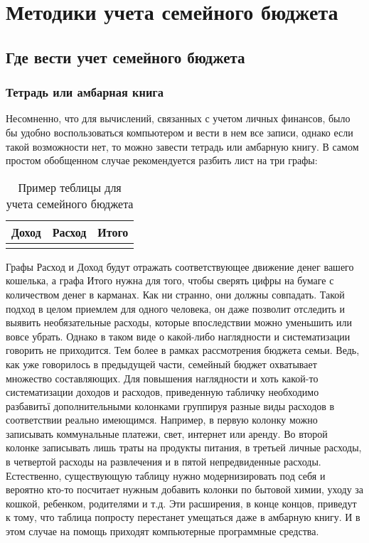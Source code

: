 
\section{Методики учета семейного бюджета}

\subsection{Где вести учет семейного бюджета}

\subsubsection{Тетрадь или амбарная книга}
Несомненно, что для вычислений, связанных с учетом личных финансов,
было бы удобно воспользоваться компьютером и вести в нем все записи, однако если такой возможности нет, то можно завести тетрадь или амбарную
книгу. В самом простом обобщенном случае рекомендуется разбить лист на
три графы:
\begin{table}[H]
\caption{Пример теблицы для учета семейного бюджета}
\label{tab:t1}
\begin{center}
\begin{tabular}{|r|p{5.5cm}|p{2.5cm}|}
\hline 
Доход & Расход & Итого \\ 
\hline 
 &  &  \\ 
\hline 
\end{tabular} 
\end{center}
\end{table}

Графы Расход и Доход будут отражать соответствующее движение
денег вашего кошелька, а графа Итого нужна для того, чтобы сверять цифры на бумаге с количеством денег в карманах. Как ни странно, они должны
совпадать.
Такой подход в целом приемлем для одного человека, он даже позволит
отследить и выявить необязательные расходы, которые впоследствии можно
уменьшить или вовсе убрать. Однако в таком виде о какой-либо наглядности
и систематизации говорить не приходится. Тем более в рамках рассмотрения
бюджета семьи. Ведь, как уже говорилось в предыдущей части, семейный
бюджет охватывает множество составляющих.
Для повышения наглядности и хоть какой-то систематизации доходов и
расходов, приведенную табличку необходимо разбавитьї дополнительными
колонками группируя разные виды расходов в соответствии реально имеющимся.
Например, в первую колонку можно записывать коммунальные платежи,
свет, интернет или аренду. Во второй колонке записывать лишь траты на
продукты питания, в третьей личные расходы, в четвертой расходы на развлечения и в пятой непредвиденные расходы.
Естественно, существующую таблицу нужно модернизировать под себя и
вероятно кто-то посчитает нужным добавить колонки по бытовой химии, уходу за кошкой, ребенком, родителями и т.д.
Эти расширения, в конце концов, приведут к тому, что таблица попросту
перестанет умещаться даже в амбарную книгу. И в этом случае на помощь
приходят компьютерные программные средства.

